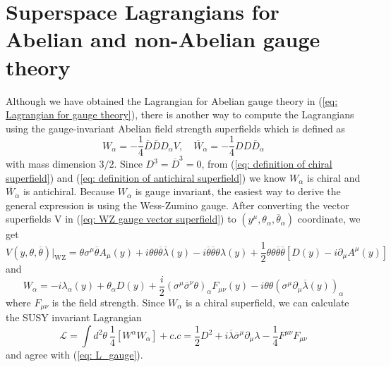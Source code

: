 \documentclass[12pt]{report}
\begin{document}
\section{Superspace Lagrangians for Abelian and non-Abelian gauge theory}
Although we have obtained the Lagrangian for Abelian gauge theory in (\ref{eq: Lagrangian for gauge theory}), there is another way to compute the Lagrangians using the gauge-invariant Abelian field strength superfields which is defined as
\begin{equation}
W_{\alpha} = -\frac{1}{4} \overline{D} \overline{D} D_{\alpha} V, \quad
\overline{W}_{\dot{\alpha}} = -\frac{1}{4} D D \overline{D}_{\dot{\alpha}}
\end{equation}
with mass dimension $3/2$.
Since $D^{3} = \overline{D}^{3} = 0$, from (\ref{eq: definition of chiral superfield}) and (\ref{eq: definition of antichiral superfield}) we know $W_{\alpha}$ is chiral and $\overline{W}_{\dot{\alpha}}$ is antichiral.
Because $W_{\alpha}$ is gauge invariant, the easiest way to derive the general expression is using the Wess-Zumino gauge.
After converting the vector superfields V in (\ref{eq: WZ gauge vector superfield}) to $(y^{\mu}, \theta_{\alpha}, \overline{\theta}_{\dot{\alpha}})$ coordinate, we get
\begin{equation}
V (y, \theta, \overline{\theta}) |_{\mathrm{WZ}} = \theta \sigma^{\mu} \overline{\theta} A_{\mu} (y) + i \theta \theta \overline{\theta} \overline{\lambda} (y) - i \overline{\theta} \overline{\theta} \theta \lambda (y) + \frac{1}{2} \theta \theta \overline{\theta} \overline{\theta} [ D(y) - i \partial_{\mu} A^{\mu} (y) ]
\end{equation}
and
\begin{equation} \label{eq: field strength chiral superfield in abelian gauge}
W_{\alpha} = -i \lambda_{\alpha} (y) + \theta_{\alpha} D(y) + \frac{i}{2} (\sigma^{\mu} \overline{\sigma}^{\nu} \theta)_{\alpha} F_{\mu \nu} (y) - i \theta \theta (\sigma^{\mu} \partial_{\mu} \overline{\lambda} (y))_{\alpha}
\end{equation}
where $F_{\mu \nu}$ is the field strength.
Since $W_{\alpha}$ is a chiral superfield, we can calculate the SUSY invariant Lagrangian
\begin{equation}
\mathcal{L} = \int d^{2} \theta \ \frac{1}{4} [W^{\alpha} W_{\alpha}] + c.c = \frac{1}{2} D^{2} + i \overline{\lambda} \overline{\sigma}^{\mu} \partial_{\mu} \lambda - \frac{1}{4} F^{\mu \nu} F_{\mu \nu}
\end{equation}
and agree with (\ref{eq: L_gauge}).
\end{document}
